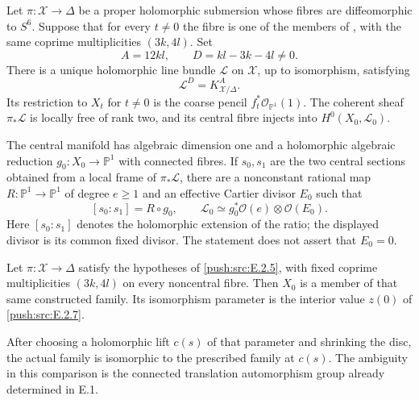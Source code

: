 \begin{proposition}\hypertarget{tag-033D}{}\label{push:src:E.2.5}


Let $\pi:\mathcal X\to\Delta$ be a proper holomorphic submersion
whose fibres are diffeomorphic to $S^6$.  Suppose that for every
$t\ne0$ the fibre is one of the members of , with the same
coprime multiplicities $(3k,4l)$.  Set
\[
 A=12kl,\qquad D=kl-3k-4l\ne0.
\]
There is a unique holomorphic line bundle $\mathcal L$ on
$\mathcal X$, up to isomorphism, satisfying
\[
 \mathcal L^{D}=K_{\mathcal X/\Delta}^{A}.
\]
Its restriction to $X_t$ for $t\ne0$ is the coarse pencil
$f_t^*\mathcal O_{\mathbb P^1}(1)$.  The coherent sheaf
$\pi_*\mathcal L$ is locally free of rank two, and its central
fibre injects into $H^0(X_0,\mathcal L_0)$.

The central manifold has algebraic dimension one and a
holomorphic algebraic reduction $g_0:X_0\to\mathbb P^1$ with
connected fibres.  If $s_0,s_1$ are the two central sections
obtained from a local frame of $\pi_*\mathcal L$, there are a
nonconstant rational map $R:\mathbb P^1\to\mathbb P^1$ of
degree $e\ge1$ and an effective Cartier divisor $E_0$ such that
\[
 [s_0:s_1]=R\circ g_0,\qquad
 \mathcal L_0\simeq g_0^*\mathcal O(e)\otimes\mathcal O(E_0).
\]
Here $[s_0:s_1]$ denotes the holomorphic extension of the ratio;
the displayed divisor is its common fixed divisor.  The
statement does not assert that $E_0=0$.
\end{proposition}

\begin{proposition}\hypertarget{tag-0337}{}\label{push:src:E.2.21}


Let $\pi:\mathcal X\to\Delta$ satisfy the hypotheses of
\ref{push:src:E.2.5}, with fixed coprime multiplicities $(3k,4l)$ on
every noncentral fibre.  Then $X_0$ is a member of that
same constructed family.  Its isomorphism parameter is
the interior value $z(0)$ of \ref{push:src:E.2.7}.

After choosing a holomorphic lift $c(s)$ of that parameter
and shrinking the disc, the actual family is isomorphic
to the prescribed family at $c(s)$.  The ambiguity in
this comparison is the connected translation automorphism
group already determined in E.1.
\end{proposition}

